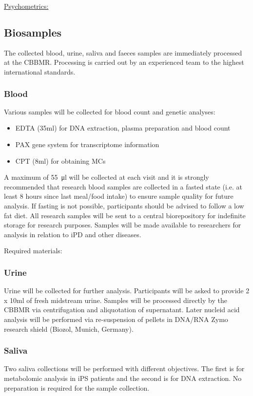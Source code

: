 \underline{Psychometrics:}

\subsection{Biosamples}
\label{subsec:biosamples}
The collected blood, urine, saliva and faeces samples are immediately processed at the \ac{CBBMR}. Processing is carried out by an experienced team to the highest international standards. 

\subsubsection{Blood}
\label{biosamples:blood}
Various samples will be collected for blood count and genetic analyses:
\begin{itemize}
\item EDTA (35ml) for DNA extraction, plasma preparation and blood count
\item PAX gene system for transcriptome information
\item CPT (8ml) for obtaining MCs
\end{itemize}
A maximum of \SI[round-precision = 0, round-mode = places]{55}{\micro\litre} will be collected at each visit and it is strongly recommended that research blood samples are collected in a fasted state (i.e. at least 8 hours since last meal/food intake) to ensure sample quality for future analysis. If fasting is not possible, participants should be advised to follow a low fat diet. All research samples will be sent to a central biorepository for indefinite storage for research purposes. Samples will be made available to researchers for analysis in relation to \ac{iPD} and other diseases.

Required materials:

\subsubsection{Urine}
\label{biosamples:urine}
Urine will be collected for further analysis. Participants will be asked to provide 2 x 10ml of fresh midstream urine. Samples will be processed directly by the \ac{CBBMR} via centrifugation and aliquotation of supernatant. Later nucleid acid analysis will be performed via re-suspension of pellets in DNA/RNA Zymo research shield (Biozol, Munich, Germany).

\subsubsection{Saliva}
\label{biosamples:saliva}
Two saliva collections will be performed with different objectives. The first is for metabolomic analysis in \ac{iPS} patients and the second is for DNA extraction. No preparation is required for the sample collection.

